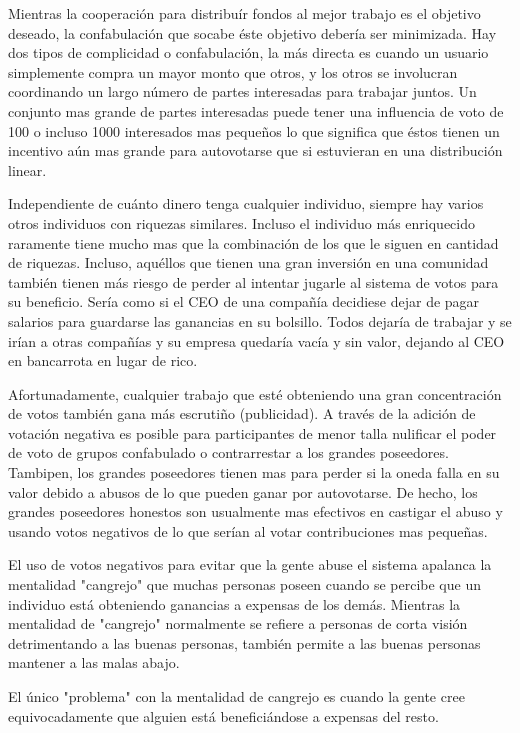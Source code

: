 \documentclass[a4paper,titlepage,final]{article}
\begin{document}
Mientras la cooperación para distribuír fondos al mejor trabajo es el objetivo deseado, la confabulación que socabe éste objetivo debería ser minimizada. Hay dos tipos de complicidad o confabulación, la más directa es cuando un usuario simplemente compra un mayor monto que otros, y los otros se involucran coordinando un largo número de partes interesadas para trabajar juntos. Un conjunto mas grande de partes interesadas puede tener una influencia de voto de 100 o incluso 1000 interesados mas pequeños lo que significa que éstos tienen un incentivo aún mas grande para autovotarse que si estuvieran en una distribución linear.

Independiente de cuánto dinero tenga cualquier individuo, siempre hay varios otros individuos con riquezas similares. Incluso el individuo más enriquecido raramente tiene mucho mas que la combinación de los que le siguen en cantidad de riquezas. Incluso, aquéllos que tienen una gran inversión en una comunidad también tienen más riesgo de perder al intentar jugarle al sistema de votos para su beneficio. Sería como si el CEO de una compañía decidiese dejar de pagar salarios para guardarse las ganancias en su bolsillo. Todos dejaría de trabajar y se irían a otras compañías y su empresa quedaría vacía y sin valor, dejando al CEO en bancarrota en lugar de rico.

Afortunadamente, cualquier trabajo que esté obteniendo una gran concentración de votos también gana más escrutiño (publicidad). A través de la adición de votación negativa es posible para participantes de menor talla nulificar el poder de voto de grupos confabulado o contrarrestar a los grandes poseedores. Tambipen, los grandes poseedores tienen mas para perder si la oneda falla en su valor debido a abusos de lo que pueden ganar por autovotarse. De hecho, los grandes poseedores honestos son usualmente mas efectivos en castigar el abuso y usando votos negativos de lo que serían al votar contribuciones mas pequeñas.

El uso de votos negativos para evitar que la gente abuse el sistema apalanca la mentalidad "cangrejo" que muchas personas poseen cuando se percibe que un individuo está obteniendo ganancias a expensas de los demás. Mientras la mentalidad de "cangrejo" normalmente se refiere a personas de corta visión detrimentando a las buenas personas, también permite a las buenas personas mantener a las malas abajo.

El único "problema" con la mentalidad de cangrejo es cuando la gente cree equivocadamente que alguien está beneficiándose a expensas del resto.
\end{document}
